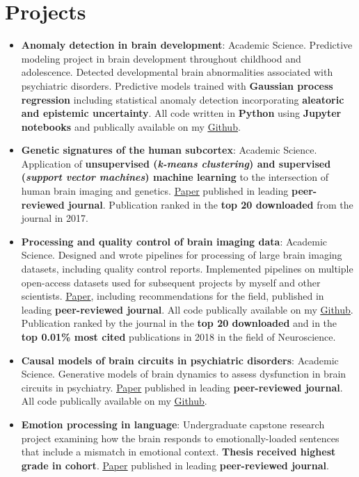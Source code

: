 \documentclass[letterpaper,10pt]{article}
\newcommand{\resumeItem}[2]{
  \item\small{
    \textbf{#1}{: #2 \vspace{-2pt}}
  }
}
\newcommand{\resumeSubItem}[2]{\resumeItem{#1}{#2}\vspace{-4pt}}
\newcommand{\resumeSubHeadingListStart}{\begin{itemize}[leftmargin=*]}
\newcommand{\resumeSubHeadingListEnd}{\end{itemize}}
\begin{document}
\section{Projects}
  \resumeSubHeadingListStart
    \resumeSubItem{Anomaly detection in brain development}
      {Academic Science. Predictive modeling project in brain development throughout childhood and adolescence. Detected developmental brain abnormalities associated with psychiatric disorders. Predictive models trained with \textbf{Gaussian process regression} including statistical anomaly detection incorporating \textbf{aleatoric and epistemic uncertainty}. All code written in \textbf{Python} using \textbf{Jupyter notebooks} and publically available on my \href{https://github.com/lindenmp/NormativeNeuroDev_CrossSec}{\underline{Github}}.}
    \resumeSubItem{Genetic signatures of the human subcortex}
      {Academic Science. Application of \textbf{unsupervised (\textit{k-means clustering}) and supervised (\textit{support vector machines}) machine learning} to the intersection of human brain imaging and genetics. \href{https://onlinelibrary.wiley.com/doi/full/10.1111/gbb.12386}{\underline{Paper}} published in leading \textbf{peer-reviewed journal}. Publication ranked in the \textbf{top 20 downloaded} from the journal in 2017.}
    \resumeSubItem{Processing and quality control of brain imaging data}
      {Academic Science. Designed and wrote pipelines for processing of large brain imaging datasets, including quality control reports. Implemented pipelines on multiple open-access datasets used for subsequent projects by myself and other scientists. \href{https://www.sciencedirect.com/science/article/pii/S1053811917310972}{\underline{Paper}}, including recommendations for the field, published in leading \textbf{peer-reviewed journal}. All code publically available on my \href{https://github.com/lindenmp/rs-fMRI}{\underline{Github}}. Publication ranked by the journal in the \textbf{top 20 downloaded} and in the \textbf{top 0.01\% most cited} publications in 2018 in the field of Neuroscience.}
    \resumeSubItem{Causal models of brain circuits in psychiatric disorders}
      {Academic Science. Generative models of brain dynamics to assess dysfunction in brain circuits in psychiatry. \href{https://www.sciencedirect.com/science/article/pii/S1053811919306585}{\underline{Paper}} published in leading \textbf{peer-reviewed journal}. All code publically available on my \href{https://github.com/lindenmp/rs-fMRI/tree/master/stats/spDCM}{\underline{Github}}.}
    \resumeSubItem{Emotion processing in language}
      {Undergraduate capstone research project examining how the brain responds to emotionally-loaded sentences that include a mismatch in emotional context. \textbf{Thesis received highest grade in cohort}. \href{https://onlinelibrary.wiley.com/doi/abs/10.1111/psyp.12601}{\underline{Paper}} published in leading \textbf{peer-reviewed journal}.}
  \resumeSubHeadingListEnd
\end{document}
